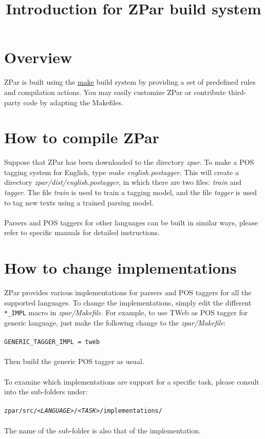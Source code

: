 \documentclass[12pt]{article}
\title{Introduction for ZPar build system}
\begin{document}
\begin{CJK}{GBK}{song}
\maketitle

\section{Overview}
\label{sec:overview}
ZPar is built using the \href{http://www.gnu.org/software/make/}{make} build system
by providing a set of predefined rules and compilation actions.
You may easily customize ZPar or contribute third-party code
by adapting the Makefiles.

\section{How to compile ZPar}
Suppose that ZPar has been downloaded to the directory \textit{zpar}. 
To make a POS tagging system for English, 
type \textit{make english.postagger}. 
This will create a directory \textit{zpar/dist/english.postagger}, 
in which there are two files: \textit{train} and \textit{tagger}. 
The file \textit{train} is used to train a tagging model,
and the file \textit{tagger} is used to tag new texts using a trained parsing model.
\\
\\
Parsers and POS taggers for other languages can be built in similar ways,
please refer to specific manuals for detailed instructions.

\section{How to change implementations}
\label{sec:how-change-impl}

ZPar provides various implementations for parsers and POS taggers for all the supported languages.
To change the implementations, simply edit the different \texttt{*\_IMPL} macro in \textit{zpar/Makefile}.
For example, to use TWeb as POS tagger for generic language, just make the following change to the \textit{zpar/Makefile}:
\\
\\
\hspace{3cm}\texttt{GENERIC_TAGGER_IMPL = tweb}
\\
\\
Then build the generic POS tagger as usual.
\\
\\
To examine which implementations are support for a specific task,
please consult into the sub-folders under:
\\
\\
\texttt{zpar/src/\textit{<LANGUAGE>}/\textit{<TASK>}/implementations/}
\\
\\
The name of the sub-folder is also that of the implementation.


\end{CJK}
\end{document}
